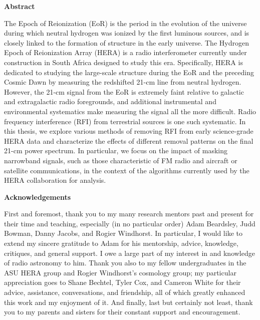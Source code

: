 \documentclass[12pt]{article}
\begin{document}
\clearpage
{}

\begin{center}
	\textbf{Abstract}
\end{center}

The Epoch of Reionization (EoR) is the period in the evolution of the universe during which neutral hydrogen was ionized by the first luminous sources, and is closely linked to the formation of structure in the early universe. The Hydrogen Epoch of Reionization Array (HERA) is a radio interferometer currently under construction in South Africa designed to study this era. Specifically, HERA is dedicated to studying the large-scale structure during the EoR and the preceding Cosmic Dawn by measuring the redshifted 21-cm line from neutral hydrogen. However, the 21-cm signal from the EoR is extremely faint relative to galactic and extragalactic radio foregrounds, and additional instrumental and environmental systematics make measuring the signal all the more difficult. Radio frequency interference (RFI) from terrestrial sources is one such systematic. In this thesis, we explore various methods of removing RFI from early science-grade HERA data and characterize the effects of different removal patterns on the final 21-cm power spectrum. In particular, we focus on the impact of masking narrowband signals, such as those characteristic of FM radio and aircraft or satellite communications, in the context of the algorithms currently used by the HERA collaboration for analysis. 

\newpage
\begingroup
\hypersetup{
	citecolor=DarkBlue,
	filecolor=black,
	linkcolor=black,
	urlcolor=DarkBlue
}
\renewcommand{\thesection}{\Roman{section}}
\tableofcontents
\listoffigures
\endgroup

\newpage
\begin{center}
	\textbf{Acknowledgements}
\end{center}

First and foremost, thank you to my many research mentors past and present for their time and teaching, especially (in no particular order) Adam Beardsley, Judd Bowman, Danny Jacobs, and Rogier Windhorst. In particular, I would like to extend my sincere gratitude to Adam for his mentorship, advice, knowledge, critiques, and general support. I owe a large part of my interest in and knowledge of radio astronomy to him. Thank you also to my fellow undergraduates in the ASU HERA group and Rogier Windhorst's cosmology group; my particular appreciation goes to Shane Bechtel, Tyler Cox, and Cameron White for their advice, assistance, conversations, and friendship, all of which greatly enhanced this work and my enjoyment of it. And finally, last but certainly not least, thank you to my parents and sisters for their constant support and encouragement.
\end{document}
